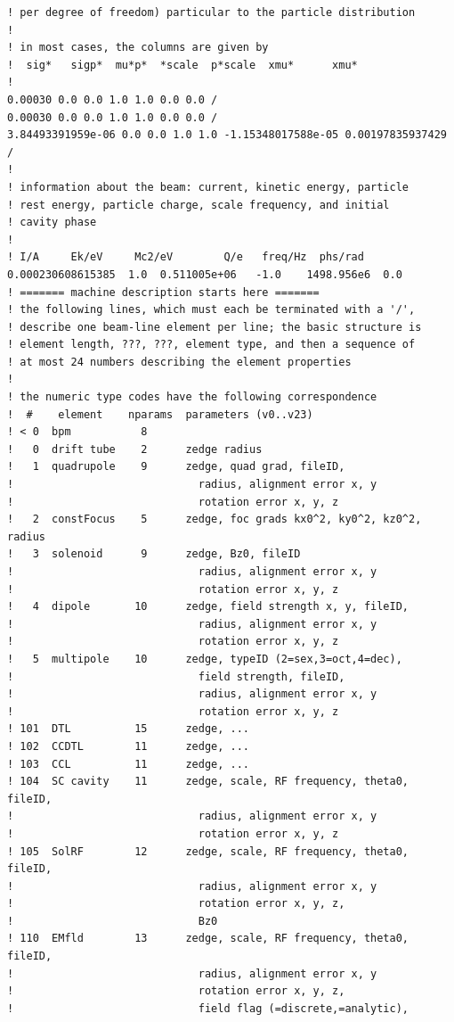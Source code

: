 \documentclass{psi-note}    %
\begin{document}
{\begin{verbatim}
! per degree of freedom) particular to the particle distribution
!
! in most cases, the columns are given by
!  sig*   sigp*  mu*p*  *scale  p*scale  xmu*      xmu*
!
0.00030 0.0 0.0 1.0 1.0 0.0 0.0 /
0.00030 0.0 0.0 1.0 1.0 0.0 0.0 /
3.84493391959e-06 0.0 0.0 1.0 1.0 -1.15348017588e-05 0.00197835937429 /
!
! information about the beam: current, kinetic energy, particle
! rest energy, particle charge, scale frequency, and initial
! cavity phase
!
! I/A     Ek/eV     Mc2/eV        Q/e   freq/Hz  phs/rad
0.000230608615385  1.0  0.511005e+06   -1.0    1498.956e6  0.0
! ======= machine description starts here =======
! the following lines, which must each be terminated with a '/',
! describe one beam-line element per line; the basic structure is
! element length, ???, ???, element type, and then a sequence of
! at most 24 numbers describing the element properties
!
! the numeric type codes have the following correspondence
!  #    element    nparams  parameters (v0..v23)
! < 0  bpm           8
!   0  drift tube    2      zedge radius
!   1  quadrupole    9      zedge, quad grad, fileID,
!                             radius, alignment error x, y
!                             rotation error x, y, z
!   2  constFocus    5      zedge, foc grads kx0^2, ky0^2, kz0^2, radius
!   3  solenoid      9      zedge, Bz0, fileID
!                             radius, alignment error x, y
!                             rotation error x, y, z
!   4  dipole       10      zedge, field strength x, y, fileID,
!                             radius, alignment error x, y
!                             rotation error x, y, z
!   5  multipole    10      zedge, typeID (2=sex,3=oct,4=dec),
!                             field strength, fileID,
!                             radius, alignment error x, y
!                             rotation error x, y, z
! 101  DTL          15      zedge, ...
! 102  CCDTL        11      zedge, ...
! 103  CCL          11      zedge, ...
! 104  SC cavity    11      zedge, scale, RF frequency, theta0, fileID,
!                             radius, alignment error x, y
!                             rotation error x, y, z
! 105  SolRF        12      zedge, scale, RF frequency, theta0, fileID,
!                             radius, alignment error x, y
!                             rotation error x, y, z,
!                             Bz0
! 110  EMfld        13      zedge, scale, RF frequency, theta0, fileID,
!                             radius, alignment error x, y
!                             rotation error x, y, z,
!                             field flag (=discrete,=analytic),

\end{verbatim}}
\end{document}
